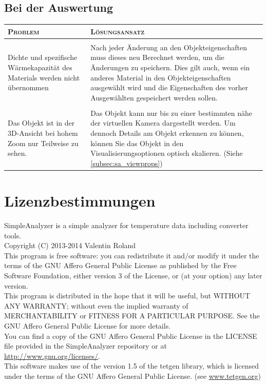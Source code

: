 \documentclass[10pt,a5paper,twoside,titlepage]{scrartcl}
\begin{document}
\subsection{Bei der Auswertung}
\begin{tabular}{p{2cm}|p{6.3cm}}
\textsc{Problem} & \textsc{Lösungsansatz}\\
\hline
\vspace{1em}&\vspace{1em}\\
Dichte und spezifische Wärmekapazität des Materials werden nicht übernommen &
Nach jeder Änderung an den Objekteigenschaften muss dieses neu Berechnet werden, um die Änderungen zu speichern. Dies gilt auch, wenn ein anderes Material in den Objekteigenschaften ausgewählt wird und die Eigenschaften des vorher Ausgewählten gespeichert werden sollen.\\
\vspace{1em}&\vspace{1em}\\

Das Objekt ist in der 3D-Ansicht bei hohem Zoom nur Teilweise zu sehen. & Das Objekt kann nur bis zu einer bestimmten nähe der virtuellen Kamera dargestellt werden. Um dennoch Details am Objekt erkennen zu können, können Sie das Objekt in den Visualisierungsoptionen optisch skalieren. (Siehe \ref{subsec:sa_viewprops})
\end{tabular}
\newpage
\section{Lizenzbestimmungen}

SimpleAnalyzer is a simple analyzer for temperature data including converter tools. \\
Copyright (C) 2013-2014 Valentin Roland\\

This program is free software: you can redistribute it and/or
modify it under the terms of the GNU Affero General Public License
as published by the Free Software Foundation, either version 3 of
the License, or (at your option) any later version.\\

This program is distributed in the hope that it will be useful,
but WITHOUT ANY WARRANTY; without even the implied warranty of
MERCHANTABILITY or FITNESS FOR A PARTICULAR PURPOSE.  See the GNU
Affero General Public License for more details.\\

You can find a copy of the GNU Affero General Public License in the LICENSE file provided in the SimpleAnalyzer repository or at \url{http://www.gnu.org/licenses/}.\\

This software makes use of the version 1.5 of the tetgen library, which is licensed under the terms of the GNU Affero General Public License. (see \url{www.tetgen.org})
\end{document}
